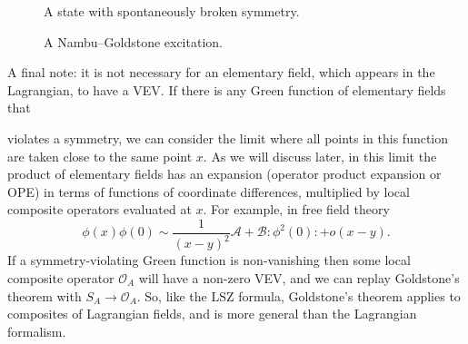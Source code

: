 \begin{figure}[htbp]
  \centering
  
  \caption{A state with spontaneously broken symmetry.}
  \label{fig:7.1}
\end{figure}

\begin{figure}[htbp]
  \centering
  
  \caption{A Nambu--Goldstone excitation.}
  \label{fig:7.2}
\end{figure}

A final note: it is not necessary for an elementary field, which appears in the
Lagrangian, to have a VEV. If there is any Green function of elementary fields
that

violates a symmetry, we can consider the limit where all points in this function
are taken close to the same point $x$. As we will discuss later, in this limit the
product of elementary fields has an expansion (operator product expansion or
OPE) in terms of functions of coordinate differences, multiplied by local
composite operators evaluated at $x$. For example, in free field theory
\begin{equation*}
  \phi(x)\phi(0)\sim\frac{1}{(x-y)^2}\mathcal A
  +\mathcal B:\!\phi^2(0)\!:+o(x-y).
\end{equation*}
If a symmetry-violating Green function is non-vanishing then some local
composite operator $\mathcal O_A$ will have a non-zero VEV, and we can replay
Goldstone's theorem with $S_A\to\mathcal O_A$. So, like the LSZ formula,
Goldstone's theorem applies to composites of Lagrangian fields, and is more
general than the Lagrangian formalism.
